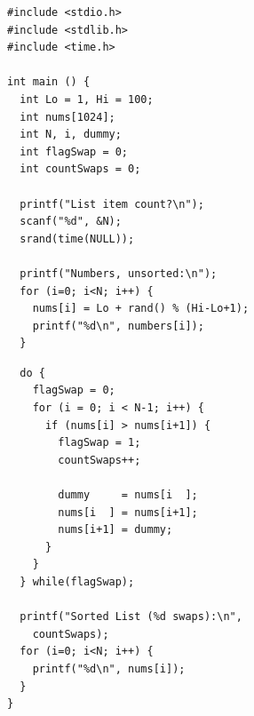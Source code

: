 \begin{frame}[fragile]%
%
%
\begin{codebox}
\begin{verbatim}
#include <stdio.h>
#include <stdlib.h>
#include <time.h>

int main () {
  int Lo = 1, Hi = 100;
  int nums[1024];
  int N, i, dummy;
  int flagSwap = 0;
  int countSwaps = 0;

  printf("List item count?\n");
  scanf("%d", &N);
  srand(time(NULL));
  
  printf("Numbers, unsorted:\n");
  for (i=0; i<N; i++) {
    nums[i] = Lo + rand() % (Hi-Lo+1);
    printf("%d\n", numbers[i]);
  }
\end{verbatim}
\end{codebox}
%
\begin{codebox}[...Fortsetzung]
\begin{verbatim}
  do {
    flagSwap = 0;
    for (i = 0; i < N-1; i++) {
      if (nums[i] > nums[i+1]) {
        flagSwap = 1;
        countSwaps++;
	    
        dummy     = nums[i  ];
        nums[i  ] = nums[i+1];
        nums[i+1] = dummy;
      }
    }
  } while(flagSwap);

  printf("Sorted List (%d swaps):\n", 
    countSwaps);
  for (i=0; i<N; i++) {
    printf("%d\n", nums[i]);
  }
}
\end{verbatim}
\end{codebox}
%
\end{frame}


